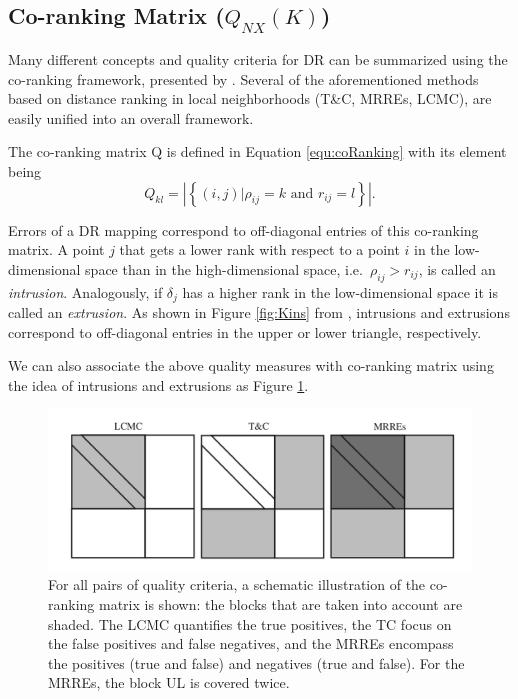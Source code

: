 \documentclass[11pt,a4paper,]{article}
\begin{document}
\hypertarget{co-ranking-matrix-q_nxk}{%
\subsection{\texorpdfstring{Co-ranking Matrix (\(Q_{NX}(K)\))}{Co-ranking Matrix (Q\_\{NX\}(K))}}\label{co-ranking-matrix-q_nxk}}

Many different concepts and quality criteria for DR can be summarized using the co-ranking framework, presented by \textcite{Lee2008-cx}. Several of the aforementioned methods based on distance ranking in local neighborhoods (T\&C, MRREs, LCMC), are easily unified into an overall framework.

The co-ranking matrix \(\mathrm{Q}\) is defined in Equation \ref{equ:coRanking} with its element being
\[
Q_{kl}=\left|\left\{(i, j) | \rho_{i j}=k \text { and } r_{i j}=l\right\}\right|.
\]

Errors of a DR mapping correspond to off-diagonal entries of this co-ranking matrix.
A point \(j\) that gets a lower rank with respect to a point \(i\) in the low-dimensional space than in the
high-dimensional space, i.e.~\(\rho_{ij} > r_{ij}\), is called an \emph{intrusion}. Analogously, if \(\delta_j\) has a higher rank in the low-dimensional space it is called an \emph{extrusion}. As shown in Figure \ref{fig:Kins} from \textcite{Lee2008-cx}, intrusions and extrusions correspond to off-diagonal entries in the upper or lower triangle, respectively.

We can also associate the above quality measures with co-ranking matrix using the idea of intrusions and extrusions as Figure \ref{fig:matrix}.

\begin{figure}

{\centering \includegraphics[width=1\linewidth]{figures/coRanking3} 

}

\caption{For all pairs of quality criteria, a schematic illustration of the co-ranking matrix is shown: the blocks that are taken into account are shaded. The LCMC quantifies the true positives, the TC focus on the false positives and false negatives, and the MRREs encompass the positives (true and false) and negatives (true and false). For the MRREs, the block UL is covered twice.}\label{fig:matrix}
\end{figure}
\end{document}
